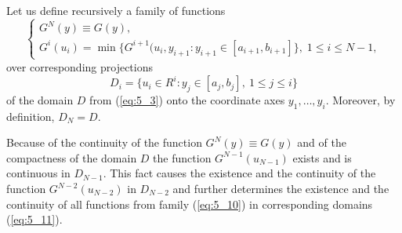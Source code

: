 Let us define recursively a family of functions
\begin{equation}
\label{eq:5_10}
  \begin{cases}
    G^N(y)\equiv G(y), \\
    G^i(u_i)=\min\{G^{i+1}(u_i,y_{i+1}:y_{i+1}\in [a_{i+1},b_{i+1}]\},\;1\leq i\leq N-1,
  \end{cases}
\end{equation}
over corresponding projections 
\begin{equation}
\label{eq:5_11}
D_i=\{u_i\in R^i:y_j\in[a_j,b_j],\:1\leq j\leq i\}
\end{equation}
of the domain $D$  from (\ref{eq:5_3}) onto the coordinate axes $y_1,\ldots,y_i$. Moreover, by definition, $D_N=D$.

Because of the continuity of the function $G^N(y)\equiv G(y)$ and of the compactness of the domain $D$ the function  $G^{N-1}(u_{N-1})$ exists and is continuous in  $D_{N-1}$. This fact causes the existence and the continuity of the function  $G^{N-2}(u_{N-2})$ in  $D_{N-2}$ and further determines the existence and the continuity of all functions from family (\ref{eq:5_10}) in corresponding domains (\ref{eq:5_11}). 

